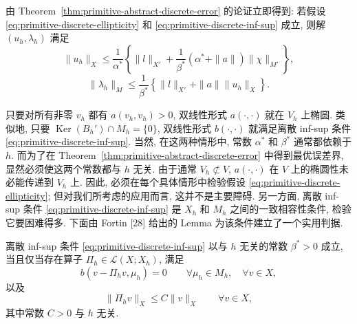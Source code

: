 \setcounter{statement}{2}
\begin{Remark}\label{rem:primitive-discrete-solution-bound}
由 Theorem~\ref{thm:primitive-abstract-discrete-error} 的论证立即得到:
若假设 \eqref{eq:primitive-discrete-ellipticity} 和
\eqref{eq:primitive-discrete-inf-sup} 成立, 则解 $(u_h,\lambda_h)$ 满足
\[
\|u_h\|_X
\leq\frac{1}{\alpha^*}\left\{
\|l\|_{X'}+\frac{1}{\beta^*}(\alpha^*+\|a\|)\|\chi\|_{M'}
\right\},
\]
\[
\|\lambda_h\|_M
\leq\frac{1}{\beta^*}\left\{\|l\|_{X'}+\|a\|\|u_h\|_X\right\}.
\]
\end{Remark}

只要对所有非零 $v_h$ 都有 $a(v_h,v_h)>0$, 双线性形式
$a(\cdot,\cdot)$ 就在 $V_h$ 上椭圆. 类似地, 只要
$\operatorname{Ker}(B_h')\cap M_h=\{0\}$, 双线性形式 $b(\cdot,\cdot)$
就满足离散 inf-sup 条件 \eqref{eq:primitive-discrete-inf-sup}.
当然, 在这两种情形中, 常数 $\alpha^*$ 和 $\beta^*$ 通常都依赖于 $h$.
而为了在 Theorem~\ref{thm:primitive-abstract-discrete-error} 中得到最优误差界,
显然必须使这两个常数都与 $h$ 无关. 由于通常 $V_h\not\subset V$,
$a(\cdot,\cdot)$ 在 $V$ 上的椭圆性未必能传递到 $V_h$ 上.
因此, 必须在每个具体情形中检验假设
\eqref{eq:primitive-discrete-ellipticity}; 但对我们所考虑的应用而言,
这并不是主要障碍. 另一方面, 离散 inf-sup 条件
\eqref{eq:primitive-discrete-inf-sup} 是 $X_h$ 和 $M_h$ 之间的一致相容性条件,
检验它要困难得多. 下面由 Fortin [28] 给出的 Lemma 为该条件建立了一个实用判据.

\setcounter{statement}{0}
\begin{Lemma}\label{lem:primitive-fortin-criterion}
离散 inf-sup 条件 \eqref{eq:primitive-discrete-inf-sup} 以与 $h$ 无关的常数
$\beta^*>0$ 成立, 当且仅当存在算子 $\Pi_h\in\mathcal L(X;X_h)$, 满足
\begin{equation}\label{eq:primitive-fortin-orthogonality}
b(v-\Pi_hv,\mu_h)=0
\qquad\forall\mu_h\in M_h,\quad\forall v\in X,
\end{equation}
以及
\begin{equation}\label{eq:primitive-fortin-stability}
\|\Pi_hv\|_X\leq C\|v\|_X
\qquad\forall v\in X,
\end{equation}
其中常数 $C>0$ 与 $h$ 无关.
\end{Lemma}

